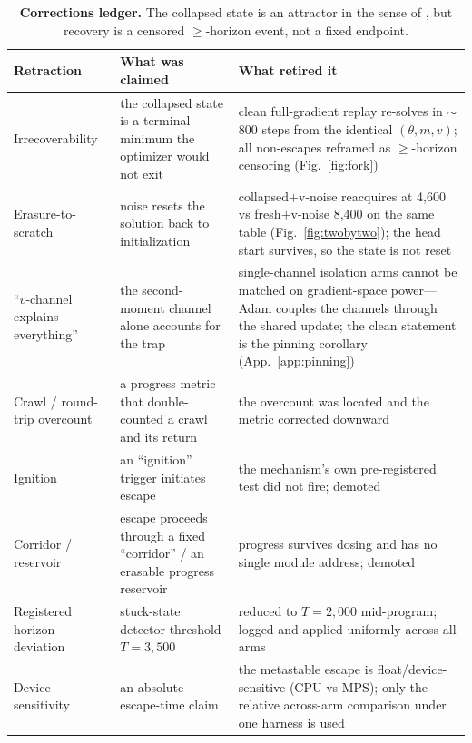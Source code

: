 \begin{table}[h]
\centering
\footnotesize
\setlength{\tabcolsep}{4pt}
\begin{tabular}{@{}p{2.9cm} p{4.0cm} p{6.0cm}@{}}
\toprule
Retraction & What was claimed & What retired it \\
\midrule
Irrecoverability & the collapsed state is a terminal minimum the optimizer would not exit & clean full-gradient replay re-solves in $\sim$800 steps from the identical $(\theta,m,v)$; all non-escapes reframed as $\ge$-horizon censoring (Fig.~\ref{fig:fork}) \\
Erasure-to-scratch & noise resets the solution back to initialization & collapsed$+$v-noise reacquires at 4{,}600 vs fresh$+$v-noise 8{,}400 on the same table (Fig.~\ref{fig:twobytwo}); the head start survives, so the state is not reset \\
``$v$-channel explains everything'' & the second-moment channel alone accounts for the trap & single-channel isolation arms cannot be matched on gradient-space power---Adam couples the channels through the shared update; the clean statement is the pinning corollary (App.~\ref{app:pinning}) \\
Crawl / round-trip overcount & a progress metric that double-counted a crawl and its return & the overcount was located and the metric corrected downward \\
Ignition & an ``ignition'' trigger initiates escape & the mechanism's own pre-registered test did not fire; demoted \\
Corridor / reservoir & escape proceeds through a fixed ``corridor'' / an erasable progress reservoir & progress survives dosing and has no single module address; demoted \\
Registered horizon deviation & stuck-state detector threshold $T=3{,}500$ & reduced to $T=2{,}000$ mid-program; logged and applied uniformly across all arms \\
Device sensitivity & an absolute escape-time claim & the metastable escape is float/device-sensitive (CPU vs MPS); only the relative across-arm comparison under one harness is used \\
\bottomrule
\end{tabular}
\caption{\textbf{Corrections ledger.} The collapsed state is an attractor in the
sense of \citet{stochcollapse}, but recovery is a censored $\ge$-horizon event,
not a fixed endpoint.}
\label{tab:corr}
\end{table}

